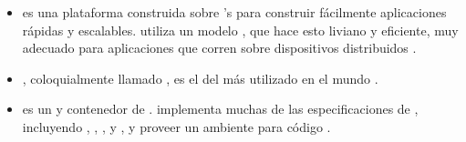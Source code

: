 	\subsubsection{\webserverINT \softwarePC }
		\begin{itemize}
			\item 
				\textbf{\nodejsNAME} es una plataforma construida sobre \chrome's \javaScriptNAME \runtimeCPT para construir fácilmente aplicaciones \networkINT rápidas y escalables. \nodejsNAME utiliza un modelo \eventdrivenPL, \nonbloking  {} que hace esto liviano y eficiente, muy adecuado para aplicaciones \dataintensive \realTimeINT que corren sobre dispositivos distribuidos \cite{technology_nodejs}.
			
			\item
				\textbf{\apacheNAME \httpNAME \serverAS }, coloquialmente llamado \apacheNAME, es el \softwarePC del \serverAS \webINT más utilizado en el mundo \cite{online_technology_apache}.
			
			\item
				\textbf{\apacheNAME \tomcatNAME }	es un \webserverINT y contenedor de \servletNAME  \openSourcePC. \tomcatNAME implementa muchas de las especificaciones de \javaeeNAME, incluyendo \javaNAME \servletNAME, \javaspNAME, \javaelNAME, y \websocketINT, y proveer un ambiente \webserverINT \httpNAME para código \javaNAME \runInCPT \cite{online_technology_officialsite_tomcat}.
		\end{itemize}

